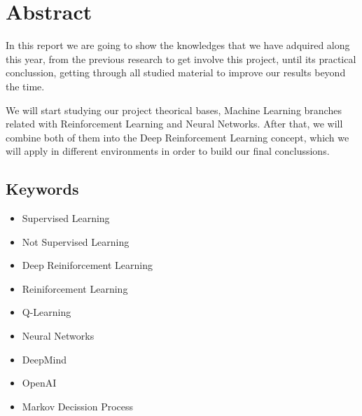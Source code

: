 \chapter*{Abstract}

In this report we are going to show the knowledges that we have adquired along this year, from the previous research to get involve this project, until its practical conclussion, getting through all studied material to improve our results beyond the time.

We will start studying our project theorical bases, Machine Learning branches related with Reinforcement Learning and Neural Networks. After that, we will combine both of them into the Deep Reinforcement Learning concept, which we will apply in different environments in order to build our final conclussions.

\section*{Keywords}

\begin{itemize}
    \item Supervised Learning
    \item Not Supervised Learning
    \item Deep Reiniforcement Learning
    \item Reiniforcement Learning
    \item Q-Learning
    \item Neural Networks
    \item DeepMind 
    \item OpenAI
    \item Markov Decission Process
\end{itemize}
   



